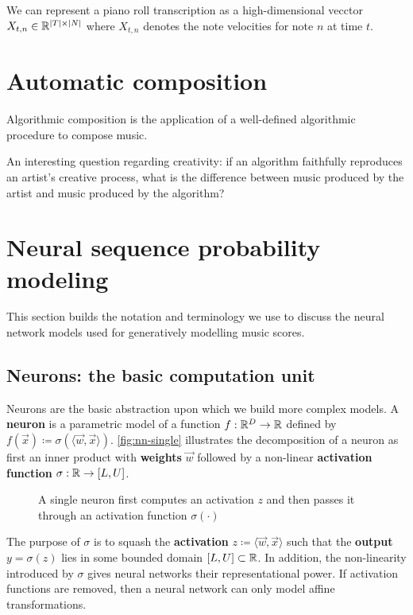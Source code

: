 We can represent a piano roll transcription as a high-dimensional vecctor
$X_{t,n} \in \mathbb{R}^{|T| \times |N|}$ where $X_{t,n}$ denotes the note
velocities for note $n$ at time $t$.

\section{Automatic composition}

Algorithmic composition is the application of a well-defined algorithmic
procedure to compose music.

An interesting question regarding creativity: if an algorithm faithfully reproduces
an artist's creative process, what is the difference between music produced by the artist
and music produced by the algorithm?

\section{Neural sequence probability modeling}

This section builds the notation and terminology we use to discuss the neural network
models used for generatively modelling music scores.

\subsection{Neurons: the basic computation unit}

Neurons are the basic abstraction upon which we build more complex
models. A \textbf{neuron} is a parametric model of a function $f : \mathbb{R}^D \to
\mathbb{R}$ defined by $f(\vec{x}) \coloneqq \sigma( \langle \vec{w}, \vec{x} \rangle
)$. \autoref{fig:nn-single} illustrates the decomposition of a neuron as first
an inner product with \textbf{weights} $\vec{w}$ followed by a non-linear
\textbf{activation function} $\sigma : \mathbb{R} \to [L, U]$.

\begin{figure}[htpb]
    \centering
    
    \caption{A single neuron first computes an activation $z$ and then passes it through
    an activation function $\sigma(\cdot)$}
    \label{fig:nn-single}
\end{figure}

The purpose of $\sigma$ is to squash the \textbf{activation} $z \coloneqq
\langle \vec{w}, \vec{x} \rangle$ such that the \textbf{output} $y = \sigma(z)$
lies in some bounded domain $[L, U] \subset \mathbb{R}$. In addition, the
non-linearity introduced by $\sigma$ gives neural networks their
representational power. If activation functions are removed, then a neural
network can only model affine transformations.


